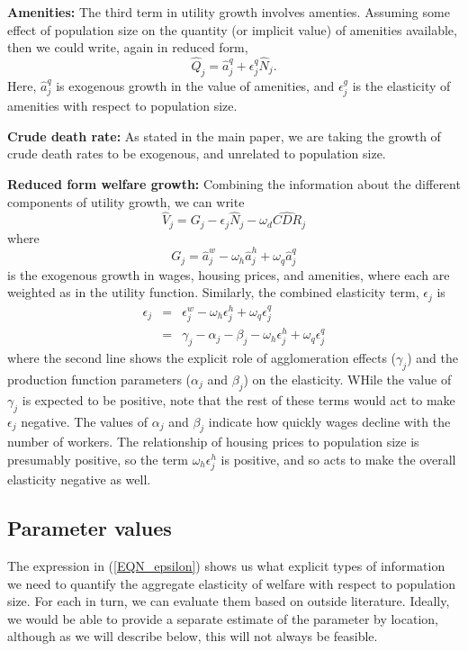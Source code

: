\documentclass[10pt]{article}
\begin{document}
\textbf{Amenities:} The third term in utility growth involves amenties. Assuming some effect of population size on the quantity (or implicit value) of amenities available, then we could write, again in reduced form,
\begin{equation}
    \hat{Q}_j = \hat{a}^q_j + \epsilon^q_j \hat{N}_j.
\end{equation}
Here, $\hat{a}^q_j$ is exogenous growth in the value of amenities, and $\epsilon^g_j$ is the elasticity of amenities with respect to population size. 

\textbf{Crude death rate:} As stated in the main paper, we are taking the growth of crude death rates to be exogenous, and unrelated to population size.

\textbf{Reduced form welfare growth:} Combining the information about the different components of utility growth, we can write
\begin{equation}
    \hat{V}_j = G_j - \epsilon_j \hat{N}_j - \omega_d \hat{CDR}_j
\end{equation}
where 
\begin{equation}
    G_j = \hat{a}^w_j - \omega_h \hat{a}^h_j + \omega_q \hat{a}^q_j
\end{equation}
is the exogenous growth in wages, housing prices, and amenities, where each are weighted as in the utility function. Similarly, the combined elasticity term, $\epsilon_j$ is
\begin{eqnarray}
    \epsilon_j &=& \epsilon^w_j - \omega_h \epsilon^h_j + \omega_q \epsilon^q_j \\
               &=& \gamma_j - \alpha_j - \beta_j - \omega_h \epsilon^h_j + \omega_q \epsilon^q_j \label{EQN_epsilon}
\end{eqnarray}
where the second line shows the explicit role of agglomeration effects ($\gamma_j$) and the production function parameters ($\alpha_j$ and $\beta_j$) on the elasticity. WHile the value of $\gamma_j$ is expected to be positive, note that the rest of these terms would act to make $\epsilon_j$ negative. The values of $\alpha_j$ and $\beta_j$ indicate how quickly wages decline with the number of workers. The relationship of housing prices to population size is presumably positive, so the term $\omega_h \epsilon^h_j$ is positive, and so acts to make the overall elasticity negative as well.

\subsection{Parameter values}
The expression in (\ref{EQN_epsilon}) shows us what explicit types of information we need to quantify the aggregate elasticity of welfare with respect to population size. For each in turn, we can evaluate them based on outside literature. Ideally, we would be able to provide a separate estimate of the parameter by location, although as we will describe below, this will not always be feasible.
\end{document}
